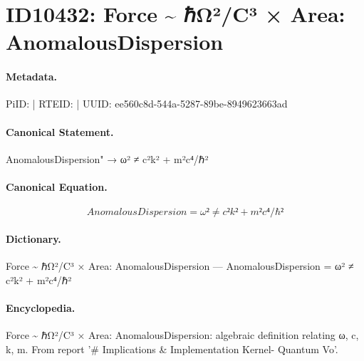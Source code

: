 \section*{ID10432: Force \textasciitilde{} ℏΩ²/C³ × Area: AnomalousDispersion}
\paragraph{Metadata.}
PiID:  | RTEID:  | UUID: ee560c8d-544a-5287-89be-8949623663ad

\paragraph{Canonical Statement.}
AnomalousDispersion" → ω² ≠ c²k² + m²c⁴/ℏ²

\paragraph{Canonical Equation.}
\[
AnomalousDispersion = ω² ≠ c²k² + m²c⁴/ℏ²
\]

\paragraph{Dictionary.}
Force \textasciitilde{} ℏΩ²/C³ × Area: AnomalousDispersion — AnomalousDispersion = ω² ≠ c²k² + m²c⁴/ℏ²

\paragraph{Encyclopedia.}
Force \textasciitilde{} ℏΩ²/C³ × Area: AnomalousDispersion: algebraic definition relating ω, c, k, m. From report '\# Implications \& Implementation Kernel- Quantum Vo'.

